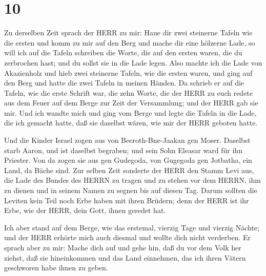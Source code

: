 \hypertarget{section-9}{%
\section{10}\label{section-9}}

 Zu derselben Zeit sprach der HERR zu mir: Haue dir zwei
steinerne Tafeln wie die ersten und komm zu mir auf den Berg und mache
dir eine hölzerne Lade,  so will ich auf die Tafeln
schreiben die Worte, die auf den ersten waren, die du zerbrochen hast;
und du sollst sie in die Lade legen.  Also machte ich die
Lade von Akazienholz und hieb zwei steinerne Tafeln, wie die ersten
waren, und ging auf den Berg und hatte die zwei Tafeln in meinen Händen.
 Da schrieb er auf die Tafeln, wie die erste Schrift war,
die zehn Worte, die der HERR zu euch redete aus dem Feuer auf dem Berge
zur Zeit der Versammlung; und der HERR gab sie mir.  Und ich
wandte mich und ging vom Berge und legte die Tafeln in die Lade, die ich
gemacht hatte, daß sie daselbst wären, wie mir der HERR geboten hatte.

 Und die Kinder Israel zogen aus von Beeroth-Bne-Jaakan gen
Moser. Daselbst starb Aaron, und ist daselbst begraben; und sein Sohn
Eleasar ward für ihn Priester.  Von da zogen sie aus gen
Gudegoda, von Gugegoda gen Jotbatha, ein Land, da Bäche sind.
 Zur selben Zeit sonderte der HERR den Stamm Levi aus, die
Lade des Bundes des HERRN zu tragen und zu stehen vor dem HERRN, ihm zu
dienen und in seinem Namen zu segnen bis auf diesen Tag. 
Darum sollten die Leviten kein Teil noch Erbe haben mit ihren Brüdern;
denn der HERR ist ihr Erbe, wie der HERR, dein Gott, ihnen geredet hat.

 Ich aber stand auf dem Berge, wie das erstemal, vierzig
Tage und vierzig Nächte; und der HERR erhörte mich auch diesmal und
wollte dich nicht verderben.  Er sprach aber zu mir: Mache
dich auf und gehe hin, daß du vor dem Volk her ziehst, daß sie
hineinkommen und das Land einnehmen, das ich ihren Vätern geschworen
habe ihnen zu geben.

